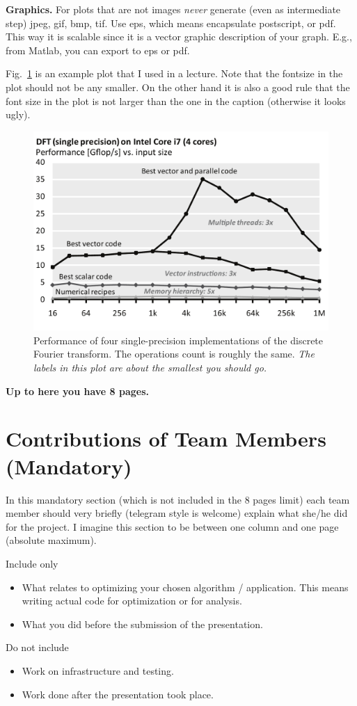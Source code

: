 \documentclass[letterpaper]{article}
\newcommand{\mypar}[1]{{\bf #1.}}
\begin{document}
\mypar{Graphics} For plots that are not images {\em never} generate (even as intermediate step)
jpeg, gif, bmp, tif. Use eps, which means encapsulate postscript, or pdf. This way it is
scalable since it is a vector graphic description of your graph. E.g.,
from Matlab, you can export to eps or pdf.

Fig.~\ref{fftperf} is an example plot that I used in a lecture. Note that the fontsize in the plot should not be any smaller. On the other hand it is also a good rule that the font size in the plot is not larger than the one in the caption (otherwise it looks ugly).

\begin{figure}\centering
  \includegraphics[scale=0.33]{dft-performance.pdf}
  \caption{Performance of four single-precision implementations of the
  discrete Fourier transform. The operations count is roughly the
  same. {\em The labels in this plot are about the smallest you should go.}
  \label{fftperf}}
\end{figure}

\bigskip
{\bf Up to here you have 8 pages.}

\section{Contributions of Team Members (Mandatory)}

In this mandatory section (which is not included in the 8 pages limit) each team member should very briefly (telegram style is welcome) explain what she/he did for the project. I imagine this section to be between one column and one page (absolute maximum).

Include only 
\begin{itemize}
	\item What relates to optimizing your chosen algorithm / application. This means writing actual code for optimization or for analysis.
	\item What you did before the submission of the presentation.
\end{itemize}
Do not include
\begin{itemize}
	\item Work on infrastructure and testing.
	\item Work done after the presentation took place.
\end{itemize}
\end{document}
